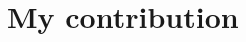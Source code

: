 \documentclass[../report.tex]{subfiles}
\begin{document}


\section{My contribution}
\end{document}
